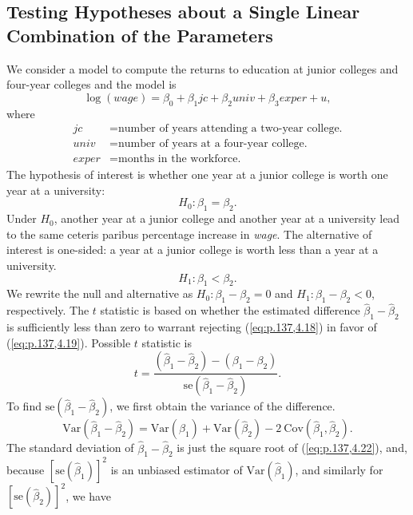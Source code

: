 \documentclass[a4paper, 10pt]{article}
\theoremstyle{definition}	%
\begin{document}
\subsection{Testing Hypotheses about a Single Linear Combination of the Parameters}
We consider a model to compute the returns to education at junior colleges and four-year colleges and the model is
\begin{equation}
    \log(wage) = \beta_0 + \beta_1 jc + \beta_2 univ + \beta_3 exper + u, \label{eq:p.136,4.17}
\end{equation}
where
\begin{align*}
    jc & = \text{number of years attending a two-year college.} \\
    univ & = \text{number of years at a four-year college.} \\
    exper & = \text{months in the workforce.}
\end{align*}
The hypothesis of interest is whether one year at a junior college is worth one year at a university:
\begin{equation}
    H_0: \beta_1 = \beta_2. \label{eq:p.137,4.18}
\end{equation}
Under $H_0$, another year at a junior college and another year at a university lead to the same ceteris paribus percentage increase in \textit{wage}. The alternative of interest is one-sided: a year at a junior college is worth less than a year at a university.
\begin{equation}
    H_1: \beta_1 < \beta_2. \label{eq:p.137,4.19}
\end{equation}
We rewrite the null and alternative as $H_0: \beta_1 - \beta_2 = 0$ and $H_1: \beta_1 - \beta_2 < 0$, respectively.
The $t$ statistic is based on whether the estimated difference $\hat{\beta}_1 - \hat{\beta}_2$ is sufficiently less than zero to warrant rejecting (\ref{eq:p.137,4.18}) in favor of (\ref{eq:p.137,4.19}). Possible $t$ statistic is
\begin{equation}
    t = \frac{(\hat{\beta}_1 - \hat{\beta}_2)-(\beta_1-\beta_2)}{\text{se}(\hat{\beta}_1 - \hat{\beta}_2)}. \label{eq:p.137,4.20}
\end{equation}
To find $\text{se}(\hat{\beta}_1 - \hat{\beta}_2)$, we first obtain the variance of the difference.
\begin{equation}
    \text{Var}(\hat{\beta}_1 - \hat{\beta}_2) = \text{Var}(\hat{\beta}_1) + \text{Var}(\hat{\beta}_2) - 2\ \text{Cov}(\hat{\beta}_1, \hat{\beta}_2). \label{eq:p.137,4.22}
\end{equation}
The standard deviation of $\hat{\beta}_1 - \hat{\beta}_2$ is just the square root of (\ref{eq:p.137,4.22}), and, because $[\text{se}(\hat{\beta}_1)]^2$ is an unbiased estimator of $\text{Var}(\hat{\beta}_1)$, and similarly for $[\text{se}(\hat{\beta}_2)]^2$, we have
\end{document}

